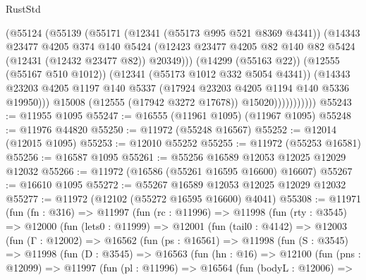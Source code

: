 \begin{lexlean}{RustStd}
\begin{coremodule}
                        (@55124
                          (@55139
                            (@55171
                              (@12341 (@55173 @995 @521 @8369 @4341))
                              (@14343
                                @23477
                                @4205
                                @374
                                @140
                                @5424
                                (@12423
                                  @23477
                                  @4205
                                  @82
                                  @140
                                  @82
                                  @5424
                                  (@12431 (@12432 @23477 @82))
                                  @20349)))
                            (@14299 (@55163 @22))
                            (@12555 (@55167 @510 @1012))
                            (@12341 (@55173 @1012 @332 @5054 @4341))
                            (@14343
                              @23203
                              @4205
                              @1197
                              @140
                              @5337
                              (@17924 @23203 @4205 @1194 @140 @5336 @19950)))
                          @15008
                          (@12555 (@17942 @3272 @17678))
                          @15020)))))))))))
@55243 := @11955 @1095
@55247 := @16555 (@11961 @1095) (@11967 @1095)
@55248 := @11976 @44820
@55250 := @11972 (@55248 @16567)
@55252 := @12014 (@12015 @1095)
@55253 := @12010 @55252
@55255 := @11972 (@55253 @16581)
@55256 := @16587 @1095
@55261 := @55256 @16589 @12053 @12025 @12029 @12032
@55266 := @11972 (@16586 (@55261 @16595 @16600) @16607)
@55267 := @16610 @1095
@55272 := @55267 @16589 @12053 @12025 @12029 @12032
@55277 := @11972 (@12102 (@55272 @16595 @16600) @4041)
@55308 := @11971
    (fun (fn : @316) =>
    @11997
      (fun (rc : @11996) =>
      @11998
        (fun (rty : @3545) =>
        @12000
          (fun (lets0 : @11999) =>
          @12001
            (fun (tail0 : @4142) =>
            @12003
              (fun (Γ : @12002) =>
              @16562
                (fun (ps : @16561) =>
                @11998
                  (fun (S : @3545) =>
                  @11998
                    (fun (D : @3545) =>
                    @16563
                      (fun (hn : @16) =>
                      @12100
                        (fun (pns : @12099) =>
                        @11997
                          (fun (pl : @11996) =>
                          @16564
                            (fun (bodyL : @12006) =>

\end{coremodule}
\end{lexlean}
